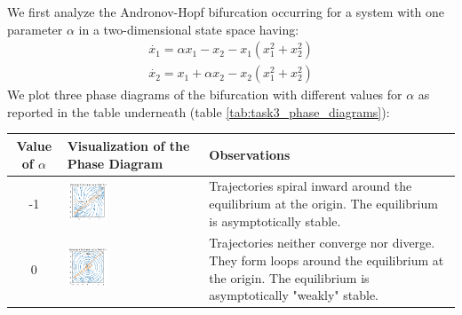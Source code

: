 We first analyze the Andronov-Hopf bifurcation occurring for a system with one parameter $\alpha$ in a two-dimensional state space having:
\begin{align*}
    \dot{x_1} = \alpha x_1 - x_2 - x_1(x_{1}^{2}+x_{2}^{2}) \\
    \dot{x_2} = x_1 + \alpha x_2 - x_2(x_{1}^{2}+x_{2}^{2})
\end{align*}
We plot three phase diagrams of the bifurcation with different values for $\alpha$ as reported in the table underneath (table \ref{tab:task3_phase_diagrams}): 

\renewcommand{\arraystretch}{1.5} %
\begin{table}[H]
    \centering
    \begin{tabular}{|c|>{\centering\arraybackslash}m{}|>{\centering\arraybackslash}m{}|}
    \hline
    \textbf{Value of $\alpha$} & \textbf{Visualization of the Phase Diagram} & \textbf{Observations} \\
    \hline
    -1 & \includegraphics[width=0.31\textwidth]{images/task3/A-H_bifurcation_-1.png} & 
    Trajectories spiral inward around the equilibrium at the origin. 
    The equilibrium is asymptotically stable. \\
    \hline
    0 & \includegraphics[width=0.31\textwidth]{images/task3/A-H_bifurcation_0.png} & 
    Trajectories neither converge nor diverge. 
    They form loops around the equilibrium at the origin.
    The equilibrium is asymptotically "weakly" stable.\\

\end{tabular}
\end{table}
